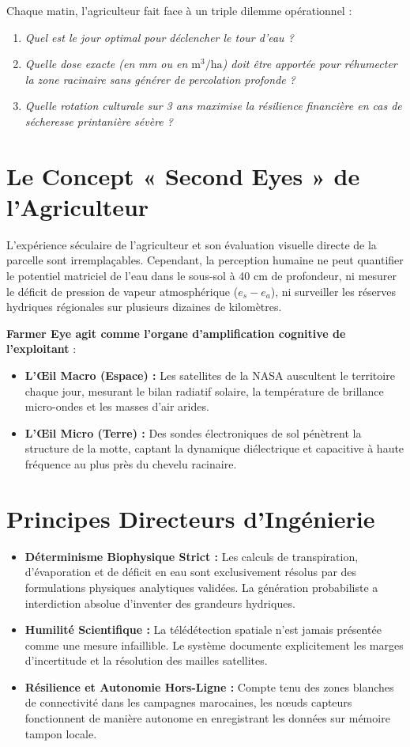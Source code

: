 \documentclass[11pt,a4paper,oneside]{report}
\begin{document}
Chaque matin, l'agriculteur fait face à un triple dilemme opérationnel :
\begin{enumerate}
    \item \textit{Quel est le jour optimal pour déclencher le tour d'eau ?}
    \item \textit{Quelle dose exacte (en mm ou en $\text{m}^3/\text{ha}$) doit être apportée pour réhumecter la zone racinaire sans générer de percolation profonde ?}
    \item \textit{Quelle rotation culturale sur 3 ans maximise la résilience financière en cas de sécheresse printanière sévère ?}
\end{enumerate}

\section{Le Concept « Second Eyes » de l'Agriculteur}
L'expérience séculaire de l'agriculteur et son évaluation visuelle directe de la parcelle sont irremplaçables. Cependant, la perception humaine ne peut quantifier le potentiel matriciel de l'eau dans le sous-sol à 40 cm de profondeur, ni mesurer le déficit de pression de vapeur atmosphérique ($e_s - e_a$), ni surveiller les réserves hydriques régionales sur plusieurs dizaines de kilomètres.

\textbf{Farmer Eye agit comme l'organe d'amplification cognitive de l'exploitant} :
\begin{itemize}[leftmargin=*]
    \item \textbf{L'Œil Macro (Espace) :} Les satellites de la NASA auscultent le territoire chaque jour, mesurant le bilan radiatif solaire, la température de brillance micro-ondes et les masses d'air arides.
    \item \textbf{L'Œil Micro (Terre) :} Des sondes électroniques de sol pénètrent la structure de la motte, captant la dynamique diélectrique et capacitive à haute fréquence au plus près du chevelu racinaire.
\end{itemize}

\section{Principes Directeurs d'Ingénierie}
\begin{itemize}[leftmargin=*]
    \item \textbf{Déterminisme Biophysique Strict :} Les calculs de transpiration, d'évaporation et de déficit en eau sont exclusivement résolus par des formulations physiques analytiques validées. La génération probabiliste a interdiction absolue d'inventer des grandeurs hydriques.
    \item \textbf{Humilité Scientifique :} La télédétection spatiale n'est jamais présentée comme une mesure infaillible. Le système documente explicitement les marges d'incertitude et la résolution des mailles satellites.
    \item \textbf{Résilience et Autonomie Hors-Ligne :} Compte tenu des zones blanches de connectivité dans les campagnes marocaines, les nœuds capteurs fonctionnent de manière autonome en enregistrant les données sur mémoire tampon locale.
\end{itemize}
\end{document}
